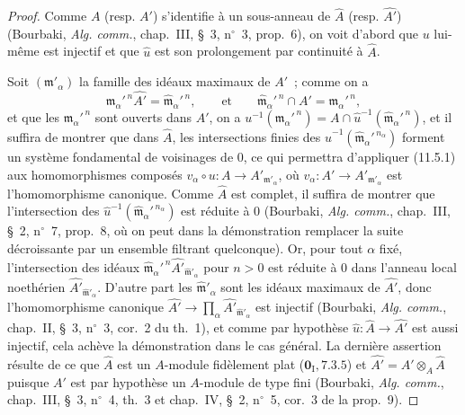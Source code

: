 \begin{proof}

Comme $A$ (resp. $A'$) s'identifie à un sous-anneau de $\widehat A$ (resp.
$\widehat{A'}$) (Bourbaki, \emph{Alg. comm.}, chap.~III, \S~3, n$^\circ$~3,
prop.~6), on voit d'abord que $u$ lui-même est injectif et que $\widehat u$ est
son prolongement par continuité à $\widehat A$.

Soit $(\mathfrak m'_\alpha)$ la famille des idéaux maximaux de $A'$~; comme on a
\[
\mathfrak m_\alpha'^{\,n}\widehat{A'}
=\widehat{\mathfrak m}_\alpha'^{\,n},
\qquad\text{et}\qquad
\widehat{\mathfrak m}_\alpha'^{\,n}\cap A'
=\mathfrak m_\alpha'^{\,n},
\]
et que les $\mathfrak m_\alpha'^{\,n}$ sont ouverts dans $A'$, on a
$u^{-1}(\mathfrak m_\alpha'^{\,n})
=A\cap\widehat u^{-1}(\widehat{\mathfrak m}_\alpha'^{\,n})$, et il suffira de
montrer que dans $\widehat A$, les intersections finies des
$\widehat u^{-1}(\widehat{\mathfrak m}_\alpha'^{\,n_\alpha})$ forment un système
fondamental de voisinages de $0$, ce qui permettra d'appliquer (11.5.1) aux
homomorphismes composés $v_\alpha\circ u:A\to A'_{\mathfrak m'_\alpha}$,
où $v_\alpha:A'\to A'_{\mathfrak m'_\alpha}$ est l'homomorphisme canonique.
Comme $\widehat A$ est complet, il suffira de montrer que l'intersection des
$\widehat u^{-1}(\widehat{\mathfrak m}_\alpha'^{\,n_\alpha})$ est réduite à
$0$ (Bourbaki, \emph{Alg. comm.}, chap.~III, \S~2, n$^\circ$~7, prop.~8, où on
peut dans la démonstration remplacer la suite décroissante par un ensemble
filtrant quelconque). Or, pour tout $\alpha$
fixé, l'intersection des idéaux
$\widehat{\mathfrak m}_\alpha'^{\,n}\widehat{A'}_{\widehat{\mathfrak m}'_\alpha}$
pour $n>0$ est réduite à $0$ dans l'anneau local noethérien
$\widehat{A'}_{\widehat{\mathfrak m}'_\alpha}$. D'autre part les
$\widehat{\mathfrak m}'_\alpha$ sont les idéaux maximaux de $\widehat{A'}$, donc
l'homomorphisme canonique
$\widehat{A'}\to\prod_\alpha\widehat{A'}_{\widehat{\mathfrak m}'_\alpha}$ est
injectif (Bourbaki, \emph{Alg. comm.}, chap.~II, \S~3, n$^\circ$~3, cor.~2 du
th.~1), et comme par hypothèse $\widehat u:\widehat A\to\widehat{A'}$ est aussi
injectif, cela achève la démonstration dans le cas général. La dernière
assertion résulte de ce que $\widehat A$ est un $A$-module fidèlement plat
($\mathbf 0_{\mathrm I},7.3.5$) et $\widehat{A'}=A'\otimes_A\widehat A$ puisque
$A'$ est par hypothèse un $A$-module de type fini (Bourbaki, \emph{Alg. comm.},
chap.~III, \S~3, n$^\circ$~4, th.~3 et chap.~IV, \S~2, n$^\circ$~5, cor.~3 de la
prop.~9).
\end{proof}

